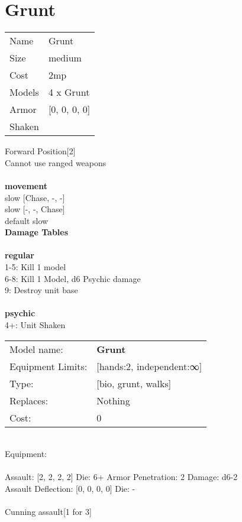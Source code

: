 \clearpage

\section{ Grunt }

\begin{tabular}{ll}
  Name & Grunt \\
  Size & medium\\
  Cost & 2mp\\
  Models & 4 x Grunt\\
  Armor & [0, 0, 0, 0]\\
  Shaken & \\
\end{tabular}

\noindent Forward Position[2]\\ 
Cannot use ranged weapons\\ 


\ \\ {\bf movement } \\
slow [Chase, -, -] \\
slow [-, -, Chase] \\
default slow \\


{\bf Damage Tables} \\
\ \\ {\bf regular } \\
1-5: Kill 1 model \\
6-8: Kill 1 Model, d6 Psychic damage \\
9: Destroy unit base \\
\ \\ {\bf psychic } \\
4+: Unit Shaken \\


\noindent
\begin{tabular}{ll}
Model name: &{\bf Grunt } \\
Equipment Limits: &[hands:2, independent:∞] \\
Type: &[bio, grunt, walks] \\
Replaces: &Nothing \\
Cost: & 0\\
\end{tabular}
\ \\
Equipment:  \\
\ \\
Assault: [2, 2, 2, 2] Die: 6+ Armor Penetration: 2 Damage: d6-2 \\
Assault Deflection: [0, 0, 0, 0] Die: -\\
\\ 
Cunning assault[1 for 3]\\ 
 
